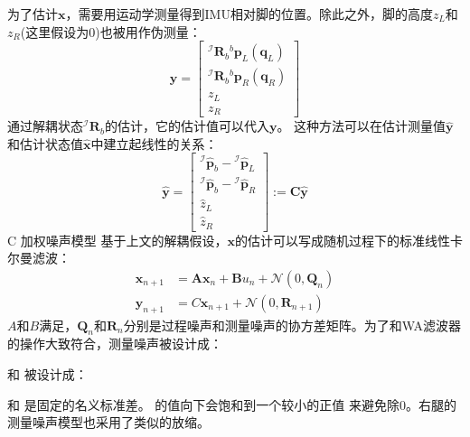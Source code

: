 为了估计$\boldsymbol{x}$，需要用运动学测量得到IMU相对脚的位置。除此之外，脚的高度$z_L$和$z_R$(这里假设为0)也被用作伪测量：
\begin{equation}
    \label{equ:est_posvel_mea}
    \boldsymbol{y}=\left[\begin{array}{c}
        { }^{\mathcal{I}} \boldsymbol{R}_b{ }^b \boldsymbol{p}_L\left(\boldsymbol{q}_L\right) \\
        { }^{\mathcal{I}} \boldsymbol{R}_b{ }^b \boldsymbol{p}_R\left(\boldsymbol{q}_R\right) \\
        z_L \\
        z_R
        \end{array}\right]
\end{equation}
通过解耦状态${ }^{\mathcal{I}} \boldsymbol{R}_{b}$的估计，它的估计值可以代入$\boldsymbol{y}$。
这种方法可以在估计测量值$\hat{\boldsymbol{y}}$和估计状态值$\hat{\boldsymbol{x}}$中建立起线性的关系：
\begin{equation}
    \label{equ:est_mea_model}
    \hat{\boldsymbol{y}}=\left[\begin{array}{c}
        { }^{\mathcal{I}} \hat{\boldsymbol{p}}_b-{ }^{\mathcal{I}} \hat{\boldsymbol{p}}_L \\
        { }^{\mathcal{I}} \hat{\boldsymbol{p}}_b-{ }^{\mathcal{I}} \hat{\boldsymbol{p}}_R \\
        \hat{z}_L \\
        \hat{z}_R
        \end{array}\right]:=\boldsymbol{C} \hat{\boldsymbol{y}}
\end{equation}
C 加权噪声模型
基于上文的解耦假设，$\boldsymbol{x}$的估计可以写成随机过程下的标准线性卡尔曼滤波：
\begin{equation}
    \label{equ:std_kf}
    \begin{aligned}
        \boldsymbol{x}_{n+1} & =\boldsymbol{A} \boldsymbol{x}_n+\boldsymbol{B} u_n+\mathcal{N}\left(0, \boldsymbol{Q}_n\right) \\
        \boldsymbol{y}_{n+1} & =C \boldsymbol{x}_{n+1}+\mathcal{N}\left(0, \boldsymbol{R}_{n+1}\right)
        \end{aligned}
\end{equation}
$A$和$B$满足，$\boldsymbol{Q}_n$和$\boldsymbol{R}_n$分别是过程噪声和测量噪声的协方差矩阵。为了和WA滤波器的操作大致符合，测量噪声被设计成：

和 被设计成：

和 是固定的名义标准差。 的值向下会饱和到一个较小的正值 来避免除0。右腿的测量噪声模型也采用了类似的放缩。

